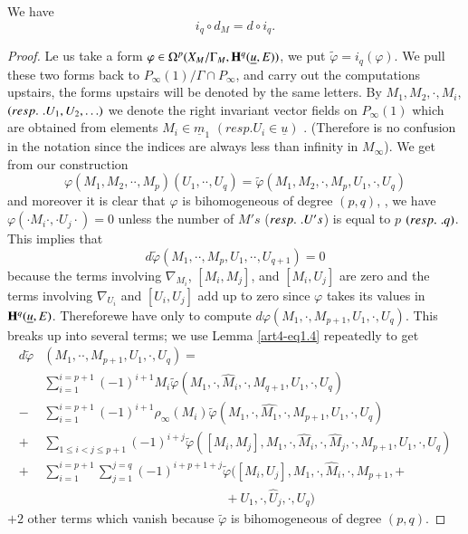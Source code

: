 \setcounter{lemma}{5}
\begin{lemma}\label{art5-lem2.6}
We have 
$$
i_q \circ d_M = d \circ i_q.
$$
\end{lemma}

\begin{proof}
Le us take a form $\varphi \in \Omega^p (X_M / \Gamma_M, \mathbf{H}^q (\underline{u}, E))$, we put $\tilde{\varphi}= i_q (\varphi)$. We pull these two forms back to $P_\infty (1)/ \Gamma \cap P_\infty$, and  carry out the computations upstairs, the forms upstairs will be denoted by the same letters. By $M_1, M_2, \cdot, M_i$, $({resp.}\kern.3em. U_1, U_2, \ldots)$ we denote the right invariant vector fields on $P_\infty(1)$ which are obtained from elements $M_i \in \underline{m}_1$ $(resp. U_i \in \underline{u})$ . (Therefore is no confusion in the notation since the indices are always less than infinity in $M_\infty$). We get from our construction
$$
\varphi (M_1, M_2, \cdot \cdot , M_p) (U_1, \cdot \cdot , U_q) = \tilde{\varphi} (M_1, M_2, \cdot , M_p, U_1, \cdot, U_q)
$$
and moreover it is clear that $\varphi$ is bihomogeneous of degree $(p,q)$, \ie, we have $\varphi (\cdot M_i \cdot , \cdot U_j \cdot) = 0$ unless the number of $M's$ (${resp.}\kern.3em. U's$) is equal to $p$ $({resp.}\kern.3em. q)$. This implies that
$$
d \tilde{\varphi} (M_1, \cdot \cdot , M_p, U_1, \cdot \cdot, U_{q+1}) = 0
$$
because the terms involving $\nabla_{M_i}$, $[M_i, M_j]$, and $[M_i, U_j]$ are zero and the terms involving $\nabla_{U_i}$ and $[U_i, U_j]$ add up to zero since $\varphi$ takes its values in $\mathbf{H}^q (\underline{u}, E)$. Therefore\pageoriginale  we have only to compute $d \varphi (M_1, \cdot , M_{p+1} , U_1, \cdot , U_q)$. This breaks up into several terms; we use Lemma \ref{art4-eq1.4} repeatedly to get 
\begin{align*}
d\tilde{\varphi}& (M_1, \cdot \cdot , M_{p+1}, U_1, \cdot, U_q) =\\
& \sum\limits^{i=p+1}_{i=1} (-1)^{i+1} M_i \tilde{\varphi} (M_1, \cdot , \hat{M}_i, \cdot, M_{q+1}, U_1, \cdot , U_q) \tag{I}\\
- & \sum\limits^{i=p+1}_{i=1} (-1)^{i+1} \rho_\infty (M_i) \tilde{\varphi} (M_1, \cdot , \hat{M_1}, \cdot, M_{p+1}, U_1, \cdot , U_q) \tag{II}\\
+ & \sum\limits_{1 \leqslant i < j \leqslant p +1} (-1)^{i+j} \tilde{\varphi} ([M_i, M_j], M_1, \cdot , \hat{M}_i, \cdot , \hat{M}_j, \cdot , M_{p+1}, U_1, \cdot , U_q) \tag{III}\\
+ & \sum\limits^{i=p+1}_{i=1} \sum\limits^{j=q}_{j=1} (-1)^{i+p+1+j} \tilde{\varphi} ([M_i, U_j], M_1, \cdot , \hat{M}_i , \cdot, M_{p+1}, +\\
& \hspace{6cm}+ U_1, \cdot, \hat{U}_j, \cdot , U_q) \tag{IV}
\end{align*}
$+2$ other terms which vanish because $\tilde{\varphi}$ is bihomogeneous of degree $(p,q)$.


\end{proof}
